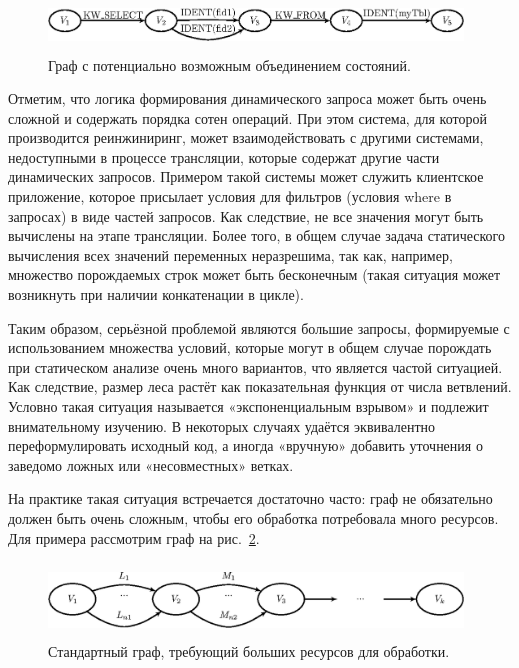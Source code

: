\documentclass[a5paper]{article}
\begin{document}
\begin{figure}
    \begin{center}
        \includegraphics[width=11cm,height=1.4cm]{graphs/states_example.eps}
        \caption{Граф с потенциально возможным объединением состояний.}
        \label{pic4}
    \end{center}
\end{figure}

Отметим, что логика формирования динамического запроса может быть очень сложной и содержать порядка сотен операций. При этом система, для которой производится реинжиниринг, может взаимодействовать с другими системами, недоступными в процессе трансляции, которые содержат другие части динамических запросов. Примером такой системы может служить клиентское приложение, которое присылает условия для фильтров (условия where в запросах) в виде частей запросов. Как следствие, не все значения могут быть вычислены на этапе трансляции. Более того, в общем случае задача статического вычисления всех значений переменных неразрешима, так как, например, множество порождаемых строк может быть бесконечным (такая ситуация может возникнуть при наличии конкатенации в цикле).

Таким образом, серьёзной проблемой являются большие запросы, формируемые с использованием множества условий, которые могут в общем случае порождать при статическом анализе очень много вариантов, что является частой ситуацией. Как следствие, размер леса растёт как показательная функция от числа ветвлений. Условно такая ситуация называется «экспоненциальным взрывом» и подлежит внимательному изучению. В некоторых случаях удаётся эквивалентно переформулировать исходный код, а иногда «вручную» добавить уточнения о заведомо ложных или «несовместных» ветках.

На практике такая ситуация встречается достаточно часто: граф не обязательно должен быть очень сложным, чтобы его обработка потребовала много ресурсов. Для примера рассмотрим граф  на рис.~\ref{pic5}.

\begin{figure}
    \begin{center}
        \includegraphics[width=11cm,height=2cm]{graphs/big_res.eps}
        \caption{Стандартный граф, требующий больших ресурсов для обработки.}
        \label{pic5}
    \end{center}
\end{figure}
\end{document}
